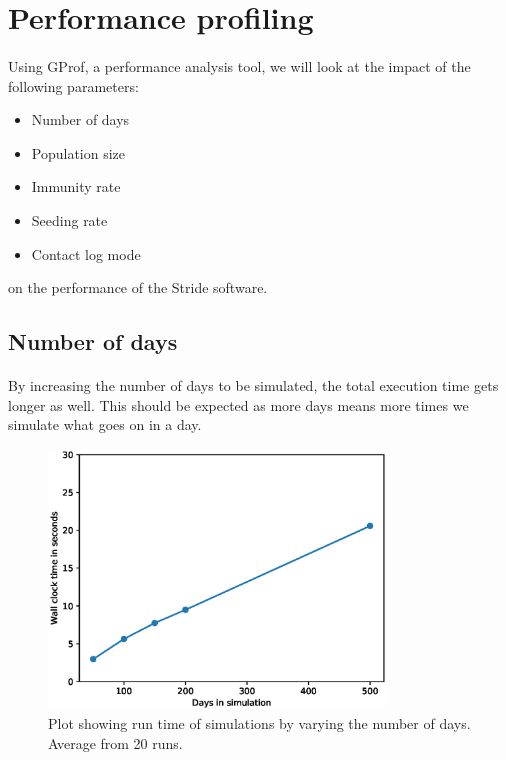 \documentclass[runningheads]{llncs}
\begin{document}
\clearpage
\section{Performance profiling}

\paragraph{} Using GProf, a performance analysis tool, we will look at the impact of the following parameters:
\begin{itemize}
	\item Number of days
	\item Population size
	\item Immunity rate
	\item Seeding rate
	\item Contact log mode
\end{itemize}
on the performance of the Stride software.

\subsection{Number of days}

\paragraph{} By increasing the number of days to be simulated, the total execution time gets longer as well. This should be expected as more days means more times we simulate what goes on in a day.
\begin{figure}[h!]
\centering
	\includegraphics[width=0.8\textwidth]{3_Performance_Profiling/3_numdays.eps}
	\caption{Plot showing run time of simulations by varying the number of days.
			Average from 20 runs.} 
	\label{Gprof_numdays}
\end{figure}
\end{document}
